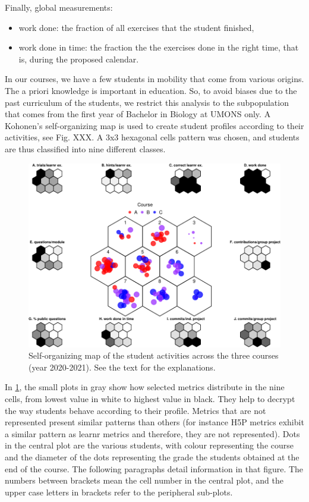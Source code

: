 \documentclass[
]{article}
\providecommand{\tightlist}{%
  \setlength{\itemsep}{0pt}\setlength{\parskip}{0pt}}
\begin{document}
Finally, global measurements:

\begin{itemize}
\tightlist
\item
  work done: the fraction of all exercises that the student finished,
\item
  work done in time: the fraction the the exercises done in the right
  time, that is, during the proposed calendar.
\end{itemize}

In our courses, we have a few students in mobility that come from
various origins. The a priori knowledge is important in education. So,
to avoid biases due to the past curriculum of the students, we restrict
this analysis to the subpopulation that comes from the first year of
Bachelor in Biology at UMONS only. A Kohonen's self-organizing map is
used to create student profiles according to their activities, see Fig.
XXX. A 3x3 hexagonal cells pattern was chosen, and students are thus
classified into nine different classes.

\begin{figure}
\centering
\includegraphics{teaching_data_science_files/figure-latex/fig_som-1.pdf}
\caption{\label{fig:fig_som} Self-organizing map of the student
activities across the three courses (year 2020-2021). See the text for
the explanations.}
\end{figure}

In \ref{fig:fig_som}, the small plots in gray show how selected metrics
distribute in the nine cells, from lowest value in white to highest
value in black. They help to decrypt the way students behave according
to their profile. Metrics that are not represented present similar
patterns than others (for instance H5P metrics exhibit a similar pattern
as learnr metrics and therefore, they are not represented). Dots in the
central plot are the various students, with colour representing the
course and the diameter of the dots representing the grade the students
obtained at the end of the course. The following paragraphs detail
information in that figure. The numbers between brackets mean the cell
number in the central plot, and the upper case letters in brackets refer
to the peripheral sub-plots.
\end{document}
